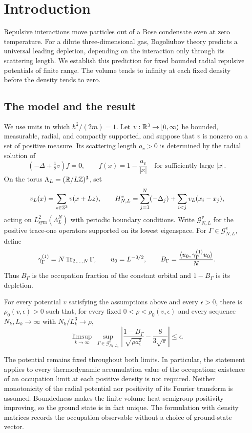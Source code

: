 \section{Introduction}\label{sec:introduction}

Repulsive interactions move particles out of a Bose condensate even at
zero temperature. For a dilute three-dimensional gas, Bogoliubov theory
predicts a universal leading depletion, depending on the interaction
only through its scattering length. We establish this prediction for
fixed bounded radial repulsive potentials of finite range. The volume
tends to infinity at each fixed density before the density tends to zero.

\subsection{The model and the result}

We use units in which $\hbar^2/(2m)=1$. Let
$v:\mathbb R^3\to[0,\infty)$ be bounded, measurable, radial, and compactly
supported, and suppose that $v$ is nonzero on a set of positive measure.
Its scattering length $a_v>0$ is determined by the radial solution of
\[
 (-\Delta+\tfrac12v)f=0,
 \qquad f(x)=1-\frac{a_v}{|x|}
 \quad\text{for sufficiently large }|x|.
\]
On the torus $\Lambda_L=(\mathbb R/L\mathbb Z)^3$, set
\[
 v_L(x)=\sum_{z\in\mathbb Z^3}v(x+Lz),
 \qquad
 H^v_{N,L}=\sum_{j=1}^N(-\Delta_j)
                   +\sum_{i<j}v_L(x_i-x_j),
\]
acting on $L^2_{\mathrm{sym}}(\Lambda_L^N)$ with periodic boundary
conditions. Write $\mathcal G^v_{N,L}$ for the positive trace-one
operators supported on its lowest eigenspace. For
$\Gamma\in\mathcal G^v_{N,L}$, define
\[
 \gamma^{(1)}_\Gamma=N\operatorname{Tr}_{2,\ldots,N}\Gamma,
 \qquad u_0=L^{-3/2},
 \qquad
 B_\Gamma=\frac{\langle u_0,\gamma^{(1)}_\Gamma u_0\rangle}{N}.
\]
Thus $B_\Gamma$ is the occupation fraction of the constant orbital and
$1-B_\Gamma$ is its depletion.

\begin{theorem}\label{thm:main}
For every potential $v$ satisfying the assumptions above and every
$\epsilon>0$, there is $\rho_0(v,\epsilon)>0$ such that, for every fixed
$0<\rho<\rho_0(v,\epsilon)$ and every sequence
$N_k,L_k\to\infty$ with $N_k/L_k^3\to\rho$,
\[
 \limsup_{k\to\infty}\ \sup_{\Gamma\in\mathcal G^v_{N_k,L_k}}
 \left|\frac{1-B_\Gamma}{\sqrt{\rho a_v^3}}
                       -\frac8{3\sqrt\pi}\right|\le\epsilon.
\]
\end{theorem}

The potential remains fixed throughout both limits. In particular, the
statement applies to every thermodynamic accumulation value of the
occupation; existence of an occupation limit at each positive density
is not required. Neither monotonicity of the radial potential nor
positivity of its Fourier transform is assumed. Boundedness makes the
finite-volume heat semigroup positivity improving, so the ground state
is in fact unique. The formulation with density matrices records the
occupation observable without a choice of ground-state vector.


